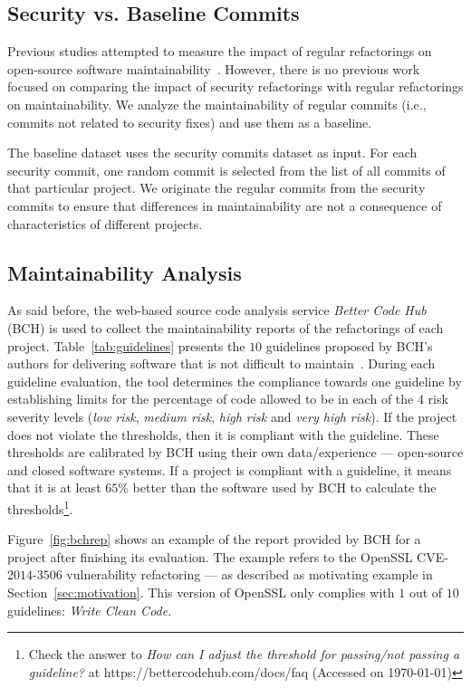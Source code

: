 \documentclass[10pt,conference]{IEEEtran}
\begin{document}
%
\subsection{Security vs. Baseline Commits}
%
Previous studies attempted to measure the impact of regular refactorings on
open-source software maintainability~\cite{HEGEDUS2018313}. However, there is no
previous work focused on comparing the impact of security refactorings with
regular refactorings on maintainability. We analyze the maintainability of
regular commits (i.e., commits not related to security fixes) and use them as a
baseline.

The baseline dataset uses the security commits dataset as input. For each
security commit, one random commit is selected from the list of all commits of
that particular project. We originate the regular commits from the security
commits to ensure that differences in maintainability are not a consequence of
characteristics of different projects.
%
\subsection{Maintainability Analysis}

As said before, the web-based source code analysis service \emph{Better Code
Hub} (BCH) is used to collect the maintainability reports of the refactorings of
each project. Table~\ref{tab:guidelines} presents the $10$ guidelines proposed
by BCH's authors for delivering software that is not difficult to
maintain~\cite{Visser:2016:OREILLY}. During each guideline evaluation, the tool
determines the compliance towards one guideline by establishing limits for the
percentage of code allowed to be in each of the $4$ risk severity levels
(\emph{low risk}, \emph{medium risk}, \emph{high risk} and \emph{very high
risk}). If the project does not violate the thresholds, then it is compliant
with the guideline. These thresholds are calibrated by BCH using their own
data/experience --- open-source and closed software systems. If a project is
compliant with a guideline, it means that it is at least $65\%$ better than the
software used by BCH to calculate the thresholds\footnote{Check the answer to
\emph{How can I adjust the threshold for passing/not passing a guideline?} at
https://bettercodehub.com/docs/faq (Accessed on \today{})}.

Figure~\ref{fig:bchrep} shows an example of the report
provided by BCH for a project after finishing its evaluation. The example
refers to the OpenSSL CVE-$2014$-$3506$ vulnerability refactoring ---
as described as motivating example in Section~\ref{sec:motivation}. This
version of OpenSSL only complies with $1$ out of $10$ guidelines: \emph{Write
Clean Code}.
\end{document}
